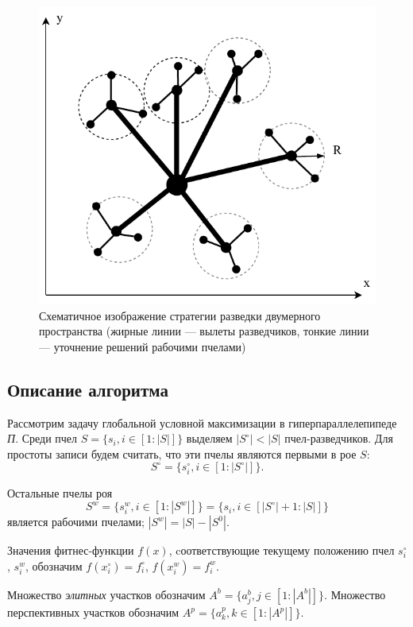 \begin{figure}[h!]
	\begin{center}
	\includegraphics[pages=-]{./inc/img/bee.pdf}
	\caption{Схематичное изображение стратегии разведки двумерного пространства (жирные линии --- вылеты разведчиков, тонкие линии --- уточнение решений рабочими пчелами)}  
	\label{fig:bee}
\end{center}
\end{figure}  


\subsection{Описание алгоритма}

Рассмотрим задачу глобальной условной максимизации в гиперпараллелепипеде \textit{П}. Среди пчел $S = \{s_i, i \in [1:|S|]\}$ выделяем $|S^{\circ}| < |S|$ пчел-разведчиков. Для простоты записи будем считать, что эти пчелы являются первыми в рое $S$: 
$$S^{\circ} = \{s_i^{\circ}, i \in [1:|S^{\circ}|]\}.$$

Остальные пчелы роя 
$$S^w = \{s_i^w, i \in [1:|S^w|]\} = \{s_i, i \in [|S^{\circ}| + 1:|S|]\}$$ является рабочими пчелами; $|S^w| = |S| - |S^0|$. 

Значения фитнес-функции $f(x)$, cоответствующие текущему положению пчел $s_i^{\circ}$, $s_i^w$, обозначим $f(x_i^{\circ}) = f_i^{\circ}$, $f(x_i^w) = f_i^w$.

Множество \textit{элитных} участков обозначим $A^b = \{a_j^b, j \in [1:|A^b|]\}$. Множество перспективных участков обозначим $A^p = \{a_k^p, k \in [1:|A^p|]\}$. 

